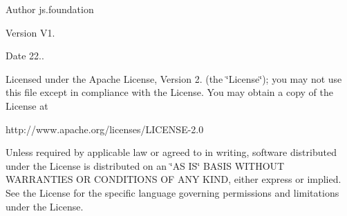 \begin{DoxyAuthor}{Author}
js.\+foundation 
\end{DoxyAuthor}
\begin{DoxyVersion}{Version}
V1. 
\end{DoxyVersion}
\begin{DoxyDate}{Date}
22.. 
\end{DoxyDate}
Licensed under the Apache License, Version 2. (the \char`\"{}\+License\char`\"{}); you may not use this file except in compliance with the License. You may obtain a copy of the License at \begin{DoxyVerb}http://www.apache.org/licenses/LICENSE-2.0
\end{DoxyVerb}


Unless required by applicable law or agreed to in writing, software distributed under the License is distributed on an \char`\"{}\+A\+S I\+S\char`\"{} B\+A\+S\+IS W\+I\+T\+H\+O\+UT W\+A\+R\+R\+A\+N\+T\+I\+ES OR C\+O\+N\+D\+I\+T\+I\+O\+NS OF A\+NY K\+I\+ND, either express or implied. See the License for the specific language governing permissions and limitations under the License. 